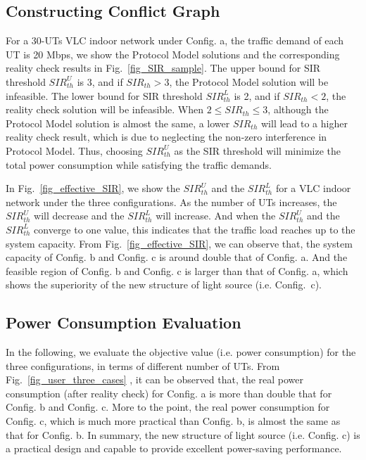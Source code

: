 \documentclass[10pt,journal]{IEEEtran}
\begin{document}
\subsection{Constructing Conflict Graph}
For a 30-UTs VLC indoor network under Config. a, the traffic demand of each UT is 20 Mbps, we show the Protocol Model solutions and the corresponding reality check results in Fig.~\ref{fig_SIR_sample}. The upper bound for SIR threshold $SIR_{th}^{U}$ is 3, and if $SIR_{th}>3$, the Protocol Model solution will be infeasible. The lower bound for SIR threshold $SIR_{th}^{L}$ is 2, and if $SIR_{th}<2$, the reality check solution will be infeasible. When $2\leq SIR_{th}\leq3$, although the Protocol Model solution is almost the same, a lower $SIR_{th}$ will lead to a higher reality check result, which is due to neglecting the non-zero interference in Protocol Model. Thus, choosing $SIR_{th}^{U}$ as the SIR threshold will minimize the total power consumption while satisfying the traffic demands.

In Fig.~\ref{fig_effective_SIR}, we show the $SIR_{th}^{U}$ and the $SIR_{th}^{L}$ for a VLC indoor network under the three configurations. As the number of UTs increases, the $SIR_{th}^{U}$ will decrease and the $SIR_{th}^{L}$ will increase. And when the $SIR_{th}^{U}$ and the $SIR_{th}^{L}$ converge to one value, this indicates that the traffic load reaches up to the system capacity. From Fig.~\ref{fig_effective_SIR}, we can observe that, the system capacity of Config. b and Config. c is around double that of Config. a. And the feasible region of Config. b and Config. c is larger than that of Config. a, which shows the superiority of the new structure of light source (i.e. Config.~c).




\subsection{Power Consumption Evaluation}
In the following, we evaluate the objective value (i.e. power consumption) for the three configurations, in terms of different number of UTs. From Fig.~\ref{fig_user_three_cases} , it can be observed that, the real power consumption (after reality check) for Config. a is more than double that for Config. b and Config. c. More to the point, the real power consumption for Config. c, which is much more practical than Config. b, is almost the same as that for Config. b. In summary, the new structure of light source (i.e. Config. c) is a practical design and capable to provide excellent power-saving performance.
\end{document}
